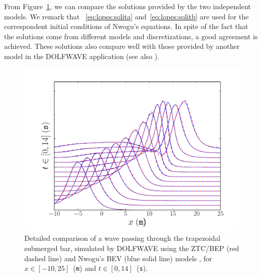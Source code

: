 From Figure~\ref{fig:lopes:zhaonwogu}, we can compare the solutions
provided by the two independent models.  We remark that
~\eqref{eq:lopes:solita} and~\eqref{eq:lopes:solitb} are used for the
correspondent initial conditions of Nwogu's equations.  In spite of
the fact that the solutions come from different models and
discretizations, a good agreement is achieved.  These solutions also
compare well with those provided by another model in the DOLFWAVE
application (see also ).

\begin{figure}
  \begin{center}
    \includegraphics[width=\largefig]{chapters/lopes/pdf/ZhaoNwogu.pdf}
  \end{center}
  \caption{Detailed comparison of a wave passing through the
    trapezoidal submerged bar,
    simulated by DOLFWAVE  using the ZTC/BEP (red dashed line) and
    Nwogu's BEV (blue solid line) models , for
    $x\in[-10,25]$~({\tt m}) and $t\in[0,14]$~({\tt s}).}
  \label{fig:lopes:zhaonwogu}
\end{figure}

